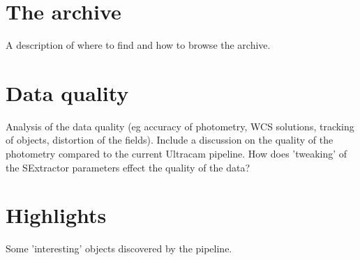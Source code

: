 \section{The archive} 

A description of where to find and how to browse the archive.

\section{Data quality}

Analysis of the data quality (eg accuracy of photometry, WCS solutions, tracking of objects, distortion of the fields). Include a discussion on the quality of the photometry compared to the current Ultracam pipeline. How does 'tweaking' of the SExtractor parameters effect the quality of the data? 

\section{Highlights}

Some 'interesting' objects discovered by the pipeline.


